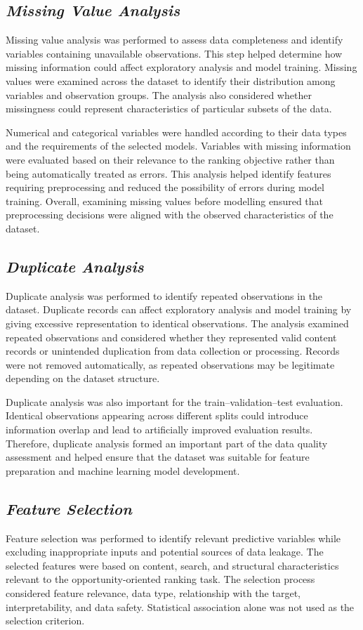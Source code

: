 \documentclass[12pt,a4paper]{report}
\begin{document}
\subsection{\textit{Missing Value Analysis}}

Missing value analysis was performed to assess data completeness and identify variables containing unavailable observations. This step helped determine how missing information could affect exploratory analysis and model training. Missing values were examined across the dataset to identify their distribution among variables and observation groups. The analysis also considered whether missingness could represent characteristics of particular subsets of the data.

Numerical and categorical variables were handled according to their data types and the requirements of the selected models. Variables with missing information were evaluated based on their relevance to the ranking objective rather than being automatically treated as errors. This analysis helped identify features requiring preprocessing and reduced the possibility of errors during model training. Overall, examining missing values before modelling ensured that preprocessing decisions were aligned with the observed characteristics of the dataset.

\subsection{\textit{Duplicate Analysis}}

Duplicate analysis was performed to identify repeated observations in the dataset. Duplicate records can affect exploratory analysis and model training by giving excessive representation to identical observations. The analysis examined repeated observations and considered whether they represented valid content records or unintended duplication from data collection or processing. Records were not removed automatically, as repeated observations may be legitimate depending on the dataset structure.

Duplicate analysis was also important for the train--validation--test evaluation. Identical observations appearing across different splits could introduce information overlap and lead to artificially improved evaluation results. Therefore, duplicate analysis formed an important part of the data quality assessment and helped ensure that the dataset was suitable for feature preparation and machine learning model development.

\subsection{\textit{Feature Selection}}
Feature selection was performed to identify relevant predictive variables while excluding inappropriate inputs and potential sources of data leakage. The selected features were based on content, search, and structural characteristics relevant to the opportunity-oriented ranking task. The selection process considered feature relevance, data type, relationship with the target, interpretability, and data safety. Statistical association alone was not used as the selection criterion.
\end{document}
